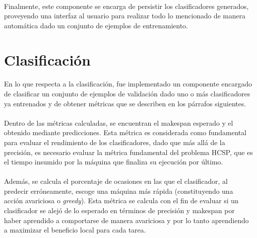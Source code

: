 \paragraph{} Finalmente, este componente se encarga de persistir los clasificadores generados, proveyendo una interfaz al usuario para realizar todo lo mencionado de manera automática dado un conjunto de ejemplos de entrenamiento.

\section{Clasificación}

\paragraph{} En lo que respecta a la clasificación, fue implementado un componente encargado de clasificar un conjunto de ejemplos de validación dado uno o más clasificadores ya entrenados y de obtener métricas que se describen en los párrafos siguientes.

\paragraph{} Dentro de las métricas calculadas, se encuentran el makespan esperado y el obtenido mediante predicciones. Esta métrica es considerada como fundamental para evaluar el rendimiento de los clasificadores, dado que más allá de la precisión, es necesario evaluar la métrica fundamental del problema HCSP, que es el tiempo insumido por la máquina que finaliza su ejecución por último.

\paragraph{} Además, se calcula el porcentaje de ocasiones en las que el clasificador, al predecir erróneamente, escoge una máquina más rápida (constituyendo una acción avariciosa o \textit{greedy}). Esta métrica se calcula con el fin de evaluar si un clasificador se alejó de lo esperado en términos de precisión y makespan por haber aprendido a comportarse de manera avariciosa y por lo tanto aprendiendo a maximizar el beneficio local para cada tarea.


